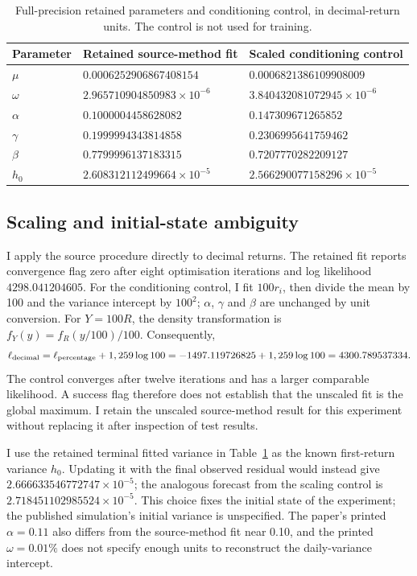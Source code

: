 \documentclass[11pt,a4paper]{article}
\theoremstyle{remark}
\begin{document}
\begin{table}[htbp]
\centering
\small
\caption{Full-precision retained parameters and conditioning control, in decimal-return units. The control is not used for training.}
\label{tab:parameters}
\begin{tabular}{@{}lll@{}}
\toprule
Parameter & Retained source-method fit & Scaled conditioning control\\
\midrule
$\mu$ & $0.0006252906867408154$ & $0.0006821386109908009$ \\
$\omega$ & $2.965710904850983\times 10^{-6}$ & $3.840432081072945\times 10^{-6}$ \\
$\alpha$ & $0.1000004458628082$ & $0.147309671265852$ \\
$\gamma$ & $0.1999994343814858$ & $0.2306995641759462$ \\
$\beta$ & $0.7799996137183315$ & $0.7207770282209127$ \\
$h_0$ & $2.608312112499664\times 10^{-5}$ & $2.566290077158296\times 10^{-5}$ \\
\bottomrule
\end{tabular}
\end{table}

\subsection{Scaling and initial-state ambiguity}
I apply the source procedure directly to decimal returns. The retained fit reports convergence flag zero after eight optimisation iterations and log likelihood $4298.041204605$. For the conditioning control, I fit $100r_i$, then divide the mean by 100 and the variance intercept by $100^2$; $\alpha$, $\gamma$ and $\beta$ are unchanged by unit conversion. For $Y=100R$, the density transformation is $f_Y(y)=f_R(y/100)/100$. Consequently,
\begin{equation}
 \ell_{\rm decimal}=\ell_{\rm percentage}+1,259\log100
 =-1497.119726825+1,259\log100=4300.789537334.
 \label{eq:scaling}
\end{equation}
The control converges after twelve iterations and has a larger comparable likelihood. A success flag therefore does not establish that the unscaled fit is the global maximum. I retain the unscaled source-method result for this experiment without replacing it after inspection of test results.

I use the retained terminal fitted variance in Table~\ref{tab:parameters} as the known first-return variance $h_0$. Updating it with the final observed residual would instead give $2.666633546772747\times 10^{-5}$; the analogous forecast from the scaling control is $2.718451102985524\times 10^{-5}$. This choice fixes the initial state of the experiment; the published simulation's initial variance is unspecified. The paper's printed $\alpha=0.11$ also differs from the source-method fit near 0.10, and the printed $\omega=0.01\%$ does not specify enough units to reconstruct the daily-variance intercept.
\end{document}
